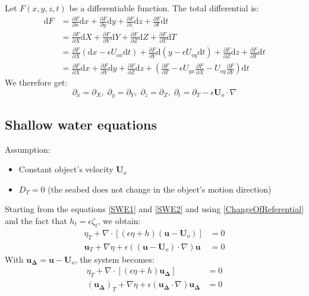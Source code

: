 \documentclass[11pt,a4paper]{article}
\begin{document}
	Let $F(x,y,z,t)$ be a differentiable function. The total differential is: 
	\begin{align*}
		\mathrm{d}F &= \frac{\partial F}{\partial x} \mathrm{d}x + \frac{\partial F}{\partial y} \mathrm{d}y + \frac{\partial F}{\partial z} \mathrm{d}z + \frac{\partial F}{\partial t} \mathrm{d}t \\
		&= \frac{\partial F}{\partial X} \mathrm{d}X + \frac{\partial F}{\partial Y} \mathrm{d}Y + \frac{\partial F}{\partial Z} \mathrm{d}Z + \frac{\partial F}{\partial T} \mathrm{d}T	\\
		&= \frac{\partial F}{\partial X} (\mathrm{d}x - \epsilon U_{ox} \mathrm{d}t) + \frac{\partial F}{\partial Y} \mathrm{d}(y - \epsilon U_{oy} \mathrm{d}t) + \frac{\partial F}{\partial Z} \mathrm{d}z + \frac{\partial F}{\partial T} \mathrm{d}t\\
		&= \frac{\partial F}{\partial X} \mathrm{d}x + \frac{\partial F}{\partial Y} \mathrm{d}y + \frac{\partial F}{\partial Z} \mathrm{d}z + (\frac{\partial F}{\partial T} -\epsilon U_{yx}\frac{\partial F}{\partial X} - U_{oy}\frac{\partial F}{\partial Y})\mathrm{d}t
	\end{align*}
	We therefore get:
	\begin{equation}
		\partial_x = \partial_X, \;
		\partial_y = \partial_Y, \;
		\partial_z = \partial_Z, \;
		\partial_t = \partial_T - \epsilon \mathbf{U}_o \cdot \nabla \label{ChangeOfReferential}
	\end{equation}
	
		\subsection{Shallow water equations}
		Assumption: 
		\begin{itemize}
			\item Constant object's velocity $\mathbf{U}_o$
			\item $D_T = 0$ (the seabed does not change in the object's motion direction)
		\end{itemize}
		Starting from the equations \eqref{SWE1} and \eqref{SWE2} and using \eqref{ChangeOfReferential} and the fact that $h_t = \epsilon \zeta_t$, we obtain:
		\begin{align}
			\eta_T + \nabla \cdot [(\epsilon \eta + h)(\mathbf{u} - \mathbf{U}_o)] &= 0 \\
			\mathbf{u}_T + \nabla \eta		+ \epsilon ((\mathbf{u} - \mathbf{U}_o)\cdot \nabla) \mathbf{u} &= 0
		\end{align}
		With $\mathbf{u_\Delta} = \mathbf{u} - \mathbf{U}_o$, the system becomes:
		\begin{align}
			\eta_T + \nabla \cdot [(\epsilon \eta + h)\mathbf{u_\Delta}] &= 0 \\
			(\mathbf{u_\Delta})_T + \nabla \eta		+ \epsilon (\mathbf{u_\Delta}\cdot \nabla) \mathbf{u_\Delta} &= 0
		\end{align}
		
\end{document}
